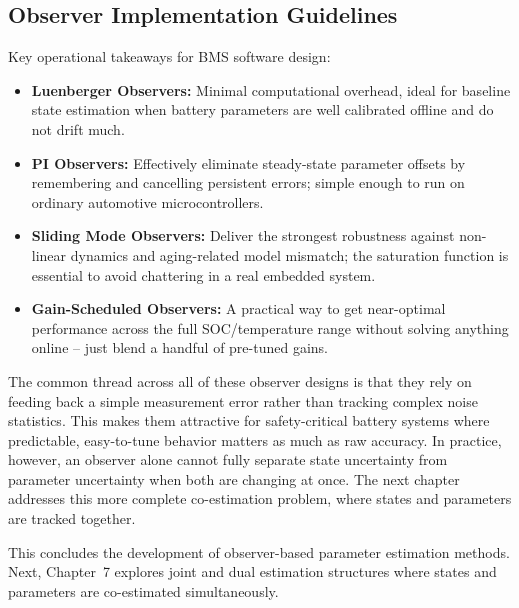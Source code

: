 \subsection{Observer Implementation Guidelines}
Key operational takeaways for BMS software design:
\begin{itemize}
    \item \textbf{Luenberger Observers:} Minimal computational overhead, ideal for baseline state estimation when battery parameters are well calibrated offline and do not drift much.
    \item \textbf{PI Observers:} Effectively eliminate steady-state parameter offsets by remembering and cancelling persistent errors; simple enough to run on ordinary automotive microcontrollers.
    \item \textbf{Sliding Mode Observers:} Deliver the strongest robustness against non-linear dynamics and aging-related model mismatch; the saturation function is essential to avoid chattering in a real embedded system.
    \item \textbf{Gain-Scheduled Observers:} A practical way to get near-optimal performance across the full SOC/temperature range without solving anything online -- just blend a handful of pre-tuned gains.
\end{itemize}

The common thread across all of these observer designs is that they rely on feeding back a simple measurement error rather than tracking complex noise statistics. This makes them attractive for safety-critical battery systems where predictable, easy-to-tune behavior matters as much as raw accuracy. In practice, however, an observer alone cannot fully separate state uncertainty from parameter uncertainty when both are changing at once. The next chapter addresses this more complete co-estimation problem, where states and parameters are tracked together.

This concludes the development of observer-based parameter estimation methods. Next, Chapter~7 explores joint and dual estimation structures where states and parameters are co-estimated simultaneously.